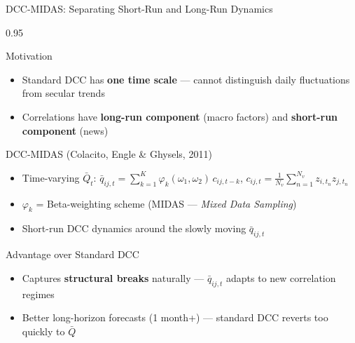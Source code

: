 \documentclass[9pt, aspectratio=169, t]{beamer}
\begin{document}
\begin{frame}{DCC-MIDAS: Separating Short-Run and Long-Run Dynamics}
    \begin{cminipage}{0.95\textwidth}
    \vspace{-3mm}
    {\scriptsize
    \begin{block}{Motivation}
        \begin{itemize}\setlength{\itemsep}{0pt}
            \item Standard DCC has \textbf{one time scale} --- cannot distinguish daily fluctuations from secular trends
            \item Correlations have \textbf{long-run component} (macro factors) and \textbf{short-run component} (news)
        \end{itemize}
    \end{block}
    \vspace{-2mm}
    \begin{block}{DCC-MIDAS (Colacito, Engle \& Ghysels, 2011)}
        \begin{itemize}\setlength{\itemsep}{0pt}
            \item Time-varying $\bar{Q}_t$: $\bar{q}_{ij,t} = \sum_{k=1}^{K} \varphi_k(\omega_1, \omega_2)\, c_{ij,t-k}$, \; $c_{ij,t} = \frac{1}{N_v}\sum_{n=1}^{N_v} z_{i,t_n}z_{j,t_n}$
            \item $\varphi_k$ = Beta-weighting scheme (MIDAS --- \textit{Mixed Data Sampling})
            \item Short-run DCC dynamics around the slowly moving $\bar{q}_{ij,t}$
        \end{itemize}
    \end{block}
    \vspace{-2mm}
    \begin{alertblock}{Advantage over Standard DCC}
        \begin{itemize}\setlength{\itemsep}{0pt}
            \item Captures \textbf{structural breaks} naturally --- $\bar{q}_{ij,t}$ adapts to new correlation regimes
            \item Better long-horizon forecasts (1 month+) --- standard DCC reverts too quickly to $\bar{Q}$
        \end{itemize}
    \end{alertblock}
    }
    \end{cminipage}
\end{frame}
\end{document}
